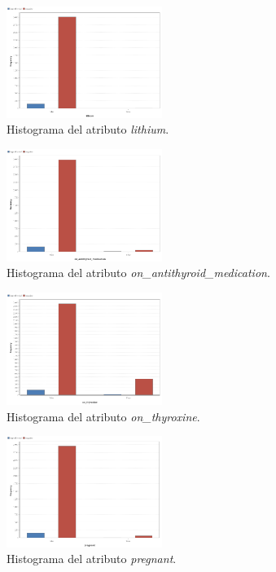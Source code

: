 \documentclass[osajnl,twocolumn,showpacs,superscriptaddress,10pt,floatfix]{revtex4-1} %
\begin{document}
\begin{figure}[H]
    \centering
    \includegraphics[width=0.45\textwidth]{analysis/histogram_lithium}
    \caption{Histograma del atributo \textit{lithium}.}
    \label{figure:histogram_lithium}
\end{figure}

\begin{figure}[H]
    \centering
    \includegraphics[width=0.45\textwidth]{analysis/histogram_on_antithyroid_medication}
    \caption{Histograma del atributo \textit{on\_antithyroid\_medication}.}
    \label{figure:on_antithyroid_medication}
\end{figure}

\begin{figure}[H]
    \centering
    \includegraphics[width=0.45\textwidth]{analysis/histogram_on_thyroxine}
    \caption{Histograma del atributo \textit{on\_thyroxine}.}
    \label{figure:on_thyroxine}
\end{figure}

\begin{figure}[H]
    \centering
    \includegraphics[width=0.45\textwidth]{analysis/histogram_pregnant}
    \caption{Histograma del atributo \textit{pregnant}.}
    \label{figure:pregnant}
\end{figure}
\end{document}
